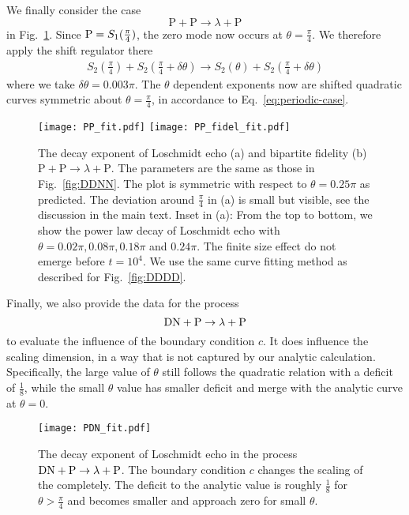 We finally consider the case
\begin{equation}
\text{P}+\text{P}\rightarrow\lambda+\text{P}
\end{equation}
in Fig.~\ref{fig:PPPP}. Since ${\rm P} = S_1( \frac{\pi}{4} ) $, the zero mode now occurs at $\theta = \frac{\pi}{4}$. We therefore apply the shift regulator there 
\begin{equation}
\begin{aligned}
\label{eq:approx_DNDN}
S_2\left(\frac{\pi}{4}\right)+S_2\left(\frac{\pi}{4}+\delta\theta\right)\rightarrow S_2(\theta)+S_2\left(\frac{\pi}{4}+\delta\theta\right)
\end{aligned}
\end{equation}
where we take $\delta\theta=0.003\pi$. The $\theta$ dependent exponents now are shifted quadratic curves symmetric about $ \theta = \frac{\pi}{4}$, in accordance to Eq.~\eqref{eq:periodic-case}.

\begin{figure}
  \centering
  \texttt{[image: PP\_fit.pdf]}
    \texttt{[image: PP\_fidel\_fit.pdf]}
    \caption{The decay exponent of Loschmidt echo (a) and bipartite fidelity (b) $\text{P}+\text{P}\rightarrow\lambda+\text{P}$. The parameters are the same as those in Fig.~\ref{fig:DDNN}. The plot is symmetric with respect to $\theta=0.25\pi$ as predicted. The deviation around $\frac{\pi}{4}$ in (a) is small but visible, see the discussion in the main text. Inset in (a): From the top to bottom, we show the power law decay of Loschmidt echo with $\theta=0.02\pi, 0.08\pi,0.18\pi$ and $0.24\pi$. The finite size effect do not emerge before $t=10^{4}$. We use the same curve fitting method as described for Fig.~\ref{fig:DDDD}.}
    \label{fig:PPPP}
\end{figure}

Finally, we also provide the data for the process
\begin{equation}
{\rm DN} + {\rm P} \rightarrow \lambda  + {\rm P}
\end{equation}
to evaluate the influence of the boundary condition $c$. It {\rm does} influence the scaling dimension, in a way that is not captured by our analytic calculation. Specifically, the large value of $\theta$ still follows the quadratic relation with a deficit of $\frac{1}{8}$, while the small $\theta$ value has smaller deficit and merge with the analytic curve at $\theta = 0$. 
\begin{figure}[htb]
\centering
\texttt{[image: PDN\_fit.pdf]}
\caption{The decay exponent of Loschmidt echo in the process ${\rm DN} + {\rm P} \rightarrow \lambda  + {\rm P}$. The boundary condition $c$ changes the scaling of the completely. The deficit to the analytic value is roughly $\frac{1}{8}$ for $\theta > \frac{\pi}{4}$ and becomes smaller and approach zero for small $\theta$. }
\label{fig:PDN_fit}
\end{figure}



